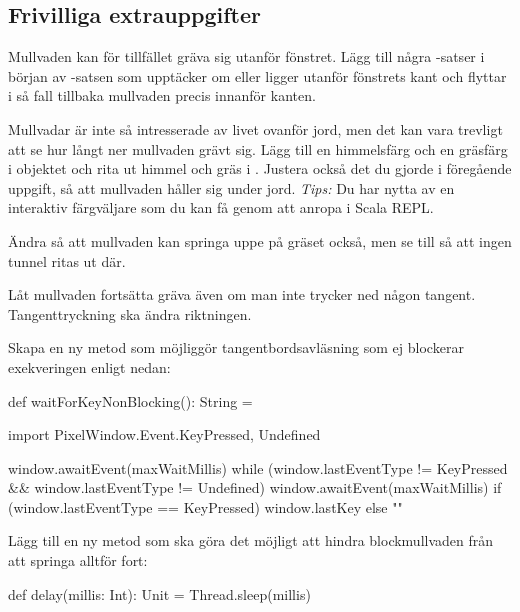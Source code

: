 
\subsection{Frivilliga extrauppgifter}

\Task
Mullvaden kan för tillfället gräva sig utanför fönstret.
Lägg till några -satser i början av -satsen som upptäcker om  eller  ligger utanför fönstrets kant och flyttar i så fall tillbaka mullvaden precis innanför kanten.

\Task
Mullvadar är inte så intresserade av livet ovanför jord, men det kan vara trevligt att se hur långt ner mullvaden grävt sig.
Lägg till en himmelsfärg och en gräsfärg i objektet  och rita ut himmel och gräs i .
Justera också det du gjorde i föregående uppgift, så att mullvaden håller sig under jord. \emph{Tips:} Du har nytta av en interaktiv färgväljare som du kan få genom att anropa  i Scala REPL.

\Task
Ändra så att mullvaden kan springa uppe på gräset också, men se till så att ingen tunnel ritas ut där.

\Task
Låt mullvaden fortsätta gräva även om man inte trycker ned någon tangent. Tangenttryckning ska ändra riktningen.

\Subtask
Skapa en ny metod  som möjliggör tangentbordsavläsning som ej blockerar exekveringen enligt nedan:

\begin{Code}
  def waitForKeyNonBlocking(): String  = {
    import PixelWindow.Event.{KeyPressed, Undefined}

    window.awaitEvent(maxWaitMillis)
    while (window.lastEventType != KeyPressed  &&
           window.lastEventType != Undefined) {
      window.awaitEvent(maxWaitMillis)
    }
    if (window.lastEventType == KeyPressed) window.lastKey else ""
  }
\end{Code}

\Subtask
Lägg till en ny metod  som ska göra det möjligt att hindra blockmullvaden från att springa alltför fort:
\begin{Code}
  def delay(millis: Int): Unit = Thread.sleep(millis)
\end{Code}


